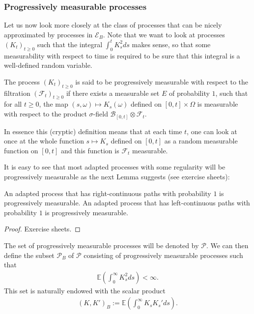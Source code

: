 \documentclass[../mainfile.tex]{subfiles}
\begin{document}
\subsubsection{Progressively measurable processes}
Let us now look more closely at the class of processes that can be nicely approximated by processes in $\mathcal{E}_B$. Note that we want to look at processes $(K_t)_{t \geq 0}$ such that the integral $\int_0^t K_s^2ds$ makes sense,  so that some measurability with respect to time is required to be sure that this integral is a well-defined random variable. 
\begin{defn} The process $(K_t)_{t \geq 0}$ is said to be progressively measurable with respect to the filtration $( \mathcal{F}_t)_{t \geq 0}$ if there exists a measurable set $E$ of probability $1$, such that for all $t \geq 0$, the map $(s, \omega) \mapsto K_s( \omega)$ defined on $[0,t] \times \Omega$ is measurable with respect to the product $\sigma$-field $\mathcal{B}_{[0,t]} \otimes \mathcal{F}_t.$
\end{defn}
\begin{rem} In essence this (cryptic) definition means that at each time $t$, one can look at once at the whole function $s \mapsto K_s$ defined on $[0,t]$ as a random measurable function on $[0,t]$ and this function is $\mathcal{F}_t$ measurable. 
\end{rem}
It is easy to see that most adapted processes with some regularity will be progressively measurable as the next Lemma suggests (see exercise sheets):
\begin{lem} An adapted process that has right-continuous paths with probability $1$ is progressively measurable. An adapted process that has left-continuous paths with probability $1$ is progressively measurable. 
\end{lem}
\begin{proof}
Exercise sheets.
\end{proof}
\begin{defn} The set of progressively measurable processes will be denoted by $\mathcal{P}$. We can then define the subset $\mathcal{P}_B$ of $\mathcal{P}$ consisting of progressively measurable processes such that 
\begin{align*}
\mathbb{E}\left( \int_0^\infty K_s^2 ds \right) < \infty.
\end{align*}
This set is naturally endowed with the scalar product
\begin{align*}
(K,K')_B := \mathbb{E} \left( \int_0^\infty K_sK_s' ds \right). 
\end{align*}
\end{defn}
\end{document}
